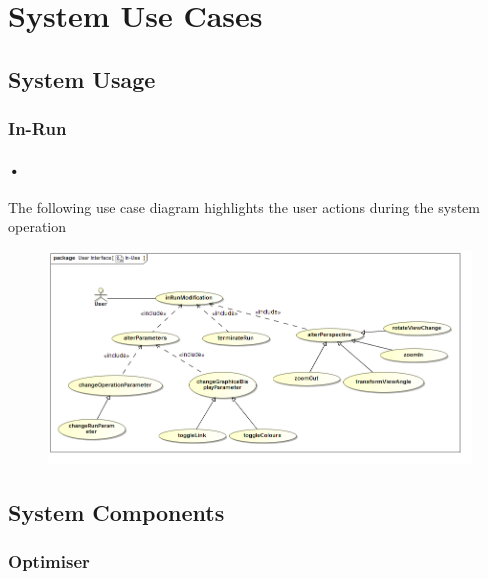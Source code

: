 \documentclass[11pt]{article}
\begin{document}
\section{System Use Cases}
\subsection{System Usage}
\subsubsection{In-Run}
\paragraph{•}
The following use case diagram highlights the user actions during the system operation
\begin{figure}[H]
	\includegraphics[scale=0.45]{inUse.png}
\end{figure}

\subsection{System Components}
\subsubsection{Optimiser}
\end{document}
